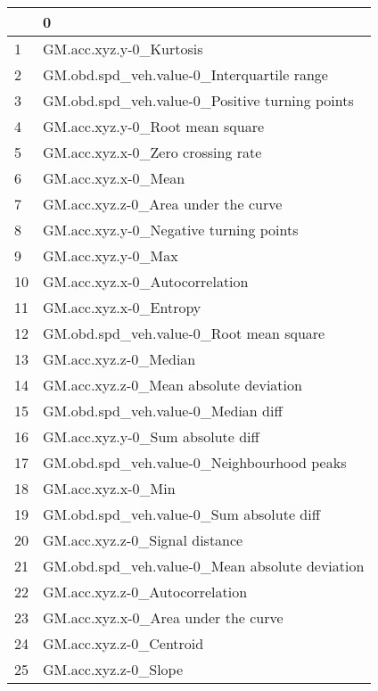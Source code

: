 \begin{tabular}{ll}
\toprule
{} &                                                 0 \\
\midrule
1   &                           GM.acc.xyz.y-0\_Kurtosis \\
2   &        GM.obd.spd\_veh.value-0\_Interquartile range \\
3   &    GM.obd.spd\_veh.value-0\_Positive turning points \\
4   &                   GM.acc.xyz.y-0\_Root mean square \\
5   &                 GM.acc.xyz.x-0\_Zero crossing rate \\
6   &                               GM.acc.xyz.x-0\_Mean \\
7   &               GM.acc.xyz.z-0\_Area under the curve \\
8   &            GM.acc.xyz.y-0\_Negative turning points \\
9   &                                GM.acc.xyz.y-0\_Max \\
10  &                    GM.acc.xyz.x-0\_Autocorrelation \\
11  &                            GM.acc.xyz.x-0\_Entropy \\
12  &           GM.obd.spd\_veh.value-0\_Root mean square \\
13  &                             GM.acc.xyz.z-0\_Median \\
14  &            GM.acc.xyz.z-0\_Mean absolute deviation \\
15  &                GM.obd.spd\_veh.value-0\_Median diff \\
16  &                  GM.acc.xyz.y-0\_Sum absolute diff \\
17  &        GM.obd.spd\_veh.value-0\_Neighbourhood peaks \\
18  &                                GM.acc.xyz.x-0\_Min \\
19  &          GM.obd.spd\_veh.value-0\_Sum absolute diff \\
20  &                    GM.acc.xyz.z-0\_Signal distance \\
21  &    GM.obd.spd\_veh.value-0\_Mean absolute deviation \\
22  &                    GM.acc.xyz.z-0\_Autocorrelation \\
23  &               GM.acc.xyz.x-0\_Area under the curve \\
24  &                           GM.acc.xyz.z-0\_Centroid \\
25  &                              GM.acc.xyz.z-0\_Slope \\

\end{tabular}
